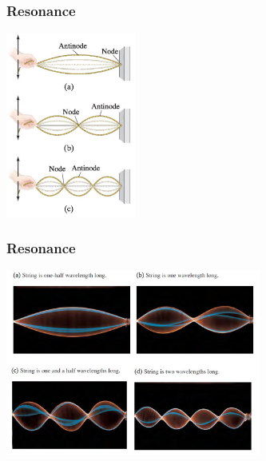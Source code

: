 \documentclass[]{beamer}
\begin{document}







\begin{frame}
\frametitle{Resonance}


\begin{center}
  \includegraphics[height=2.4in]{images4/18.jpg}
\end{center}








  \end{frame}










\begin{frame}
\frametitle{Resonance}



  \begin{center}
  \includegraphics[height=2.4in]{images4/20.jpg}
\end{center}


  \end{frame}
\end{document}
